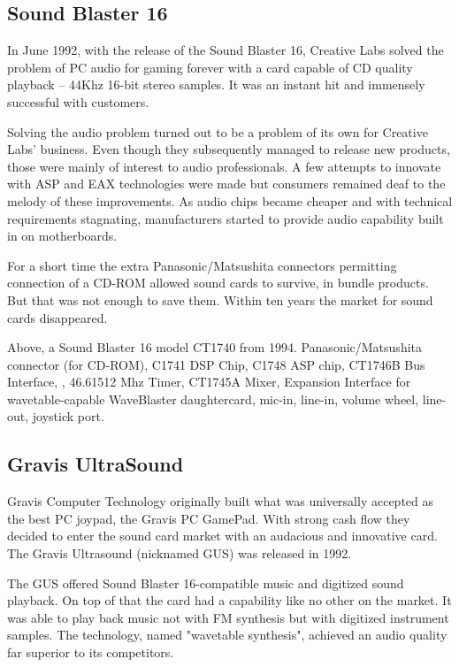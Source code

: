 \subsection{Sound Blaster 16}
 In June 1992, with the release of the Sound Blaster 16, Creative Labs solved the problem of PC audio for gaming forever with a card capable of CD quality playback -- 44Khz 16-bit stereo samples. It was an instant hit and immensely successful with customers.\\
\par
{}
\par
Solving the audio problem turned out to be a problem of its own for Creative Labs' business. Even though they subsequently managed to release new products, those were mainly of interest to audio professionals. A few attempts to innovate with ASP and EAX technologies were made but consumers remained deaf to the melody of these improvements. As audio chips became cheaper and with technical requirements stagnating, manufacturers started to provide audio capability built in on motherboards.\\
\par
For a short time the extra Panasonic/Matsushita connectors permitting connection of a CD-ROM allowed sound cards to survive, in bundle products. But that was not enough to save them. Within ten years the market for sound cards disappeared.\\
\par
{}
\par
Above, a Sound Blaster 16 model CT1740 from 1994.  Panasonic/Matsushita connector (for CD-ROM),  C1741 DSP Chip,  C1748 ASP chip,  CT1746B Bus Interface, , 46.61512 Mhz Timer,  CT1745A Mixer,  Expansion Interface for wavetable-capable WaveBlaster daughtercard,  mic-in, line-in, volume wheel, line-out, joystick port.







\subsection{Gravis UltraSound}
Gravis Computer Technology originally built what was universally accepted as the best PC joypad, the Gravis PC GamePad. With strong cash flow they decided to enter the sound card market with an audacious and innovative card. The Gravis Ultrasound (nicknamed GUS) was released in 1992.\\
\par
The GUS offered Sound Blaster 16-compatible music and digitized sound playback. On top of that the card had a capability like no other on the market. It was able to play back music not with FM synthesis but with digitized instrument samples. The technology, named "wavetable synthesis", achieved an audio quality far superior to its competitors.



